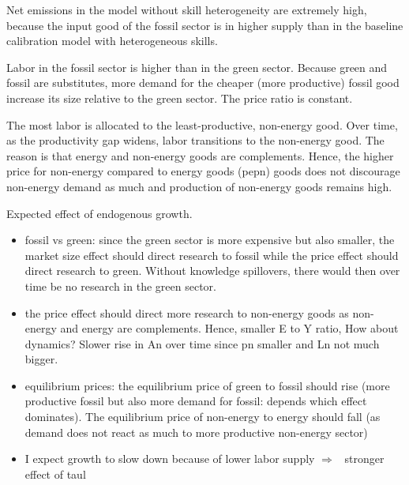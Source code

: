 \documentclass[12pt]{article}
\newcommand{\ar}{$\Rightarrow$ \ }
\begin{document}
Net emissions in the model without skill heterogeneity are extremely high, because the input good of the fossil sector is in higher supply than in the baseline calibration model with heterogeneous skills.

Labor in the fossil sector is higher than in the green sector. Because green and fossil are substitutes, more demand for the cheaper (more productive) fossil good increase its size relative to the green sector. The price ratio is constant. 

The most labor is allocated to the least-productive, non-energy good. Over time, as the productivity gap widens, labor transitions to the non-energy good. The reason is that energy and non-energy goods are complements. Hence, the higher price for non-energy compared to energy goods (pepn) goods does not discourage non-energy demand as much and production of non-energy goods remains high. 

Expected effect of endogenous growth. 
\begin{itemize}
	\item fossil vs green: since the green sector is more expensive but also smaller, the market size effect should direct research to fossil while the price effect should direct research to green. Without knowledge spillovers, there would then over time be no research in the green sector. 
	\item the price effect should direct more research to non-energy goods as non-energy and energy are complements. Hence, smaller E to Y ratio, How about dynamics? Slower rise in An over time since pn smaller and Ln not much bigger. 
	\item equilibrium prices: the equilibrium price of green to fossil should rise (more productive fossil but also more demand for fossil: depends which effect dominates). The equilibrium price of non-energy to energy should fall (as demand does not react as much to more productive non-energy sector)
	\item I expect growth to slow down because of lower labor supply \ar stronger effect of taul
\end{itemize}
\clearpage
\end{document}

